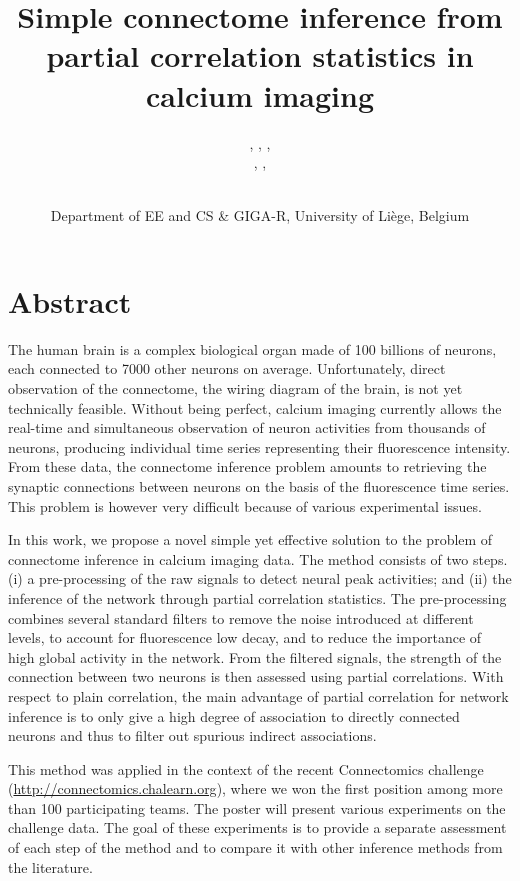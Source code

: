 \documentclass[wcp]{jmlr}
\title{Simple connectome inference from partial correlation statistics in calcium imaging}
\author{\Name{Antonio Sutera},
   \Name{Arnaud Joly},
   \Name{Vincent François-Lavet}, \Email{a.sutera@ulg.ac.be}\\
   \Name{Zixiao Aaron Qiu},
   \Name{Gilles Louppe},
   \Name{Damien Ernst}\and\Name{Pierre Geurts}
    \\
   \addr Department of EE and CS \& GIGA-R, University of Li\`ege, Belgium}
\begin{document}
\section*{Abstract}
The human brain is a complex biological organ made of 100 billions of neurons, each connected to 7000 other neurons on average. Unfortunately, direct observation of the connectome, the wiring diagram of the brain, is not yet technically feasible. Without being perfect, calcium imaging currently allows the real-time and simultaneous observation of neuron activities from thousands of neurons, producing individual time series representing their fluorescence intensity. From these data, the connectome inference problem amounts to retrieving the synaptic connections between neurons on the basis of the fluorescence time series. This problem is however very difficult because of various experimental issues.

In this work, we propose a novel simple yet effective solution to the problem of connectome inference in calcium imaging data. The method consists of two steps. (i) a pre-processing of the raw signals to detect neural peak activities; and (ii) the inference of the network through partial correlation statistics. The pre-processing combines several standard filters to remove the noise introduced at different levels, to account for fluorescence low decay, and to reduce the importance of high global activity in the network. From the filtered signals, the strength of the connection between two neurons is then assessed using partial correlations. With respect to plain correlation, the main advantage of partial correlation for network inference is to only give a high degree of association to directly connected neurons and thus to filter out spurious indirect associations.

This method was applied in the context of the recent Connectomics challenge (\url{http://connectomics.chalearn.org}), where we won the first position among more than 100 participating teams. The poster will present various experiments on the challenge data. The goal of these experiments is to provide a separate assessment of each step of the method and to compare it with other inference methods from the literature.

\cite{}
\newpage

\end{document}

